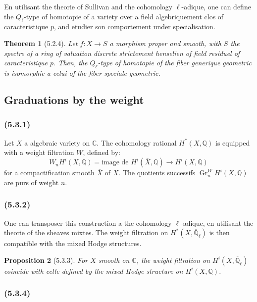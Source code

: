\documentclass[12pt,a4paper]{article}
\theoremstyle{plain}
\newtheorem{theorem}{Theorem}[section]
\newtheorem{proposition}[theorem]{Proposition}
\theoremstyle{definition}
\theoremstyle{remark}
\DeclareMathOperator{\Gr}{Gr}
\newcommand{\bbQ}{\mathbb{Q}}
\newcommand{\bbC}{\mathbb{C}}
\newcommand{\Qlb}{\overline{\mathbb{Q}}_\ell}
\begin{document}
En utilisant the theorie of Sullivan and the cohomology $\ell$-adique, one can define the $Q_\ell$-type of homotopie of a variety over a field algebriquement clos of caracteristique $p$, and etudier son comportement under specialisation.

\begin{theorem}[5.2.4]
Let $f : X \to S$ a morphism proper and smooth, with $S$ the spectre of a ring of valuation discrete strictement henselien of field residuel of caracteristique $p$. Then, the $Q_\ell$-type of homotopie of the fiber generique geometric is isomorphic a celui of the fiber speciale geometric.
\end{theorem}

\subsection{Graduations by the weight}

\subsubsection*{\textup{(5.3.1)}}

Let $X$ a algebraic variety on $\bbC$. The cohomology rational $H^*(X, \bbQ)$ is equipped with a weight filtration $W$, defined by:
\[
W_n H^i(X, \bbQ) = \text{image de } H^i(\overline{X}, \bbQ) \to H^i(X, \bbQ)
\]
for a compactification smooth $\overline{X}$ of $X$. The quotients successifs $\Gr^W_n H^i(X, \bbQ)$ are purs of weight $n$.

\subsubsection*{\textup{(5.3.2)}}

One can transposer this construction a the cohomology $\ell$-adique, en utilisant the theorie of the sheaves mixtes. The weight filtration on $H^*(X, \Qlb)$ is then compatible with the mixed Hodge structures.

\begin{proposition}[5.3.3]
For $X$ smooth on $\bbC$, the weight filtration on $H^i(X, \Qlb)$ coincide with celle defined by the mixed Hodge structure on $H^i(X, \bbQ)$.
\end{proposition}

\subsubsection*{\textup{(5.3.4)}}
\end{document}
